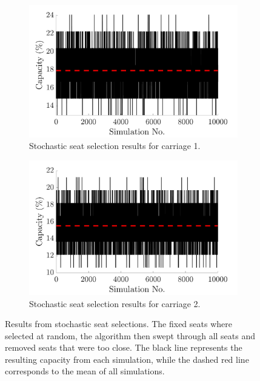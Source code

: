 \documentclass[11pt,a4paper]{article}
\begin{document}
\begin{figure}[h]
         \centering
 \begin{subfigure}[b]{0.48\textwidth}
         \centering
         \includegraphics[width=1\textwidth]{tfw_car1_sim_plot_write.png}
         \caption{Stochastic seat selection results for carriage 1.}
         \label{fig:sim1}
     \end{subfigure}
          \hfill
     \begin{subfigure}[b]{0.48\textwidth}
         \centering
         \includegraphics[width=1\textwidth]{tfw_car2_sim_plot_write.png}
         \caption{Stochastic seat selection results for carriage 2.}
         \label{fig:sim2}
     \end{subfigure}
 \caption{Results from stochastic seat selections. The fixed seats where selected at random, the algorithm then swept through all seats and removed seats that were too close. The black line represents the resulting capacity from each simulation, while the dashed red line corresponds to the mean of all simulations.}
        \label{fig:Stochastic_sims}
\end{figure}
\end{document}
